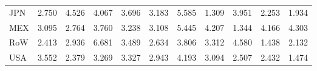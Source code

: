 \begin{table}[htbp]
\begin{tabular}{lcccccccccc}
  JPN & \textcolor[RGB]{186,120,69}{2.750} & \textcolor[RGB]{64,41,191}{4.526} & \textcolor[RGB]{92,59,163}{4.067} & \textcolor[RGB]{110,71,145}{3.696} & \textcolor[RGB]{156,101,99}{3.183} & \textcolor[RGB]{43,28,212}{5.585} & \textcolor[RGB]{250,162,5}{1.309} & \textcolor[RGB]{94,61,161}{3.951} & \textcolor[RGB]{209,135,46}{2.253} & \textcolor[RGB]{224,145,31}{1.934} \\ 
  MEX & \textcolor[RGB]{161,104,94}{3.095} & \textcolor[RGB]{184,119,71}{2.764} & \textcolor[RGB]{105,68,150}{3.760} & \textcolor[RGB]{150,97,105}{3.238} & \textcolor[RGB]{158,102,97}{3.108} & \textcolor[RGB]{48,31,207}{5.445} & \textcolor[RGB]{84,54,171}{4.207} & \textcolor[RGB]{247,160,8}{1.344} & \textcolor[RGB]{89,58,166}{4.166} & \textcolor[RGB]{82,53,173}{4.303} \\ 
  RoW & \textcolor[RGB]{199,129,56}{2.413} & \textcolor[RGB]{176,114,79}{2.936} & \textcolor[RGB]{23,15,232}{6.681} & \textcolor[RGB]{122,79,133}{3.489} & \textcolor[RGB]{189,122,66}{2.634} & \textcolor[RGB]{102,66,153}{3.806} & \textcolor[RGB]{140,91,115}{3.312} & \textcolor[RGB]{61,40,194}{4.580} & \textcolor[RGB]{237,153,18}{1.438} & \textcolor[RGB]{222,144,33}{2.132} \\ 
  USA & \textcolor[RGB]{120,78,135}{3.552} & \textcolor[RGB]{201,130,54}{2.379} & \textcolor[RGB]{143,92,112}{3.269} & \textcolor[RGB]{133,86,122}{3.327} & \textcolor[RGB]{173,112,82}{2.943} & \textcolor[RGB]{87,56,168}{4.193} & \textcolor[RGB]{163,106,92}{3.094} & \textcolor[RGB]{194,125,61}{2.507} & \textcolor[RGB]{196,127,59}{2.432} & \textcolor[RGB]{232,150,23}{1.474} \\ 
   \hline
\end{tabular}
\end{table}
